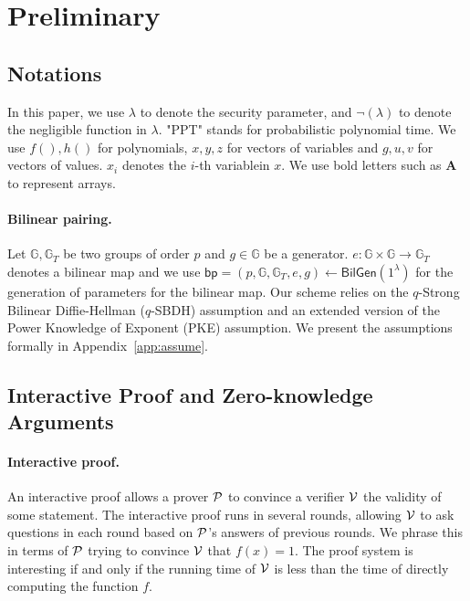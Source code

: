 \section{Preliminary}
\label{sec::prelim}

\subsection{Notations}

In this paper, we use $\lambda$ to denote the security parameter, and $\neg(\lambda)$ to denote the negligible function in $\lambda$. "PPT" stands for probabilistic polynomial time. We use $f(),h()$ for polynomials, $x,y,z$ for vectors of variables and $g,u,v$ for vectors of values. $x_i$ denotes the $i$-th variablein $x$. We use bold letters such as $\textbf{A}$ to represent arrays.

\paragraph{Bilinear pairing.} Let $\mathbb{G}, \mathbb{G}_T$ be two groups of order $p$ and $g\in\mathbb{G}$ be a generator. $e: \mathbb{G}\times\mathbb{G}\rightarrow\mathbb{G}_T$ denotes a bilinear map and we use $\mathsf{bp}=(p,\mathbb{G},\mathbb{G}_T,e,g)\leftarrow\mathsf{BilGen}(1^\lambda)$ for the generation of parameters for the bilinear map. Our scheme relies on the $q$-Strong Bilinear Diffie-Hellman ($q$-SBDH) assumption and an extended version of the Power Knowledge of Exponent (PKE) assumption. We present the assumptions formally in Appendix~\ref{app:assume}.



\subsection{Interactive Proof and Zero-knowledge Arguments}

\paragraph{Interactive proof.} An interactive proof allows a prover $\P$ to convince a verifier $\V$ the validity of some statement. The interactive proof runs in several rounds, allowing $\V$ to ask questions in each round based on $\P$'s answers of previous rounds. We phrase this in terms of $\P$ trying to convince $\V$ that $f(x)=1$. The proof system is interesting if and only if the running time of $\V$ is less than the time of directly computing the function $f$.

